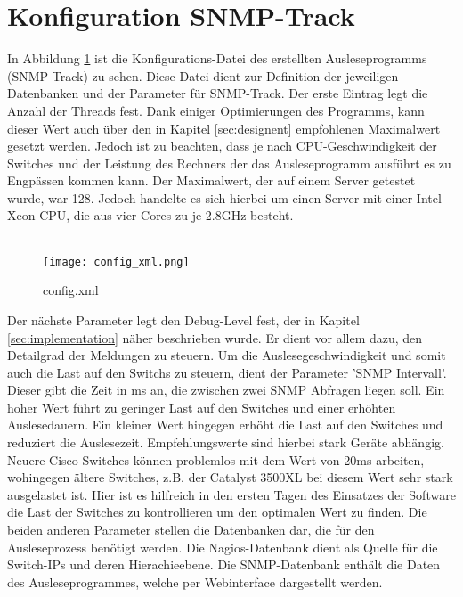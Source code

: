 \section*{Konfiguration SNMP-Track}
\label{sec:config}

In Abbildung \ref{fig:config_xml} ist die Konfigurations-Datei des erstellten Ausleseprogramms (SNMP-Track) zu sehen.
Diese Datei dient zur Definition der jeweiligen Datenbanken und der Parameter für SNMP-Track.
Der erste Eintrag legt die Anzahl der Threads fest. Dank einiger Optimierungen des Programms, kann dieser Wert auch über den in Kapitel \ref{sec:designent} empfohlenen Maximalwert gesetzt werden.
Jedoch ist zu beachten, dass je nach CPU-Geschwindigkeit der Switches und der Leistung des Rechners der das Ausleseprogramm ausführt es zu Engpässen kommen kann.
Der Maximalwert, der auf einem Server getestet wurde, war 128. Jedoch handelte es sich hierbei um einen Server mit einer Intel Xeon-CPU, die aus vier Cores zu je 2.8GHz besteht.\\\\

\begin{figure}[H]
\centering
\texttt{[image: config\_xml.png]}
\caption[]{config.xml}
\label{fig:config_xml}
\end{figure}

Der nächste Parameter legt den Debug-Level fest, der in Kapitel \ref{sec:implementation} näher beschrieben wurde.
Er dient vor allem dazu, den Detailgrad der Meldungen zu steuern.
Um die Auslesegeschwindigkeit und somit auch die Last auf den Switchs zu steuern, dient der Parameter 'SNMP Intervall'.
Dieser gibt die Zeit in ms an, die zwischen zwei SNMP Abfragen liegen soll. Ein hoher Wert führt zu geringer Last auf den Switches und einer erhöhten Auslesedauern.
Ein kleiner Wert hingegen erhöht die Last auf den Switches und reduziert die Auslesezeit.
Empfehlungswerte sind hierbei stark Geräte abhängig. Neuere Cisco Switches können problemlos mit dem Wert von 20ms arbeiten, wohingegen ältere Switches, z.B. der Catalyst 3500XL bei diesem Wert sehr stark ausgelastet ist.
Hier ist es hilfreich in den ersten Tagen des Einsatzes der Software die Last der Switches zu kontrollieren um den optimalen Wert zu finden.
Die beiden anderen Parameter stellen die Datenbanken dar, die für den Ausleseprozess benötigt werden.
Die Nagios-Datenbank dient als Quelle für die Switch-IPs und deren Hierachieebene.
Die SNMP-Datenbank enthält die Daten des Ausleseprogrammes, welche per Webinterface dargestellt werden.

